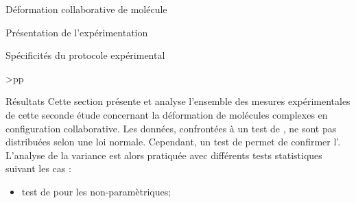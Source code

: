 \documentclass[myfrancais,ngerman,english,frenchb]{mythesis}
\begin{document}
\begin{mychapter}{Déformation collaborative de molécule}
\begin{mysection}{Présentation de l'expérimentation}
\begin{mysubsection}{Spécificités du protocole expérimental}
\begin{mytable}
\begin{mytabular}{>{\bfseries}p{\exptwofirstcolumn}p{\exptwosecondcolumn}}
						\mymiddlerule[\heavyrulewidth]
						 \\
						\mybottomrule
					\end{mytabular}
				\end{mytable}
			\end{mysubsection}
		\end{mysection}
		\begin{mysection}{Résultats}
			Cette section présente et analyse l'ensemble des mesures expérimentales de cette seconde étude concernant la déformation de molécules complexes en configuration collaborative.
			Les données, confrontées à un test de , ne sont pas distribuées selon une loi normale.
			Cependant, un test de  permet de confirmer l'.
			L'analyse de la variance est alors pratiquée avec différents tests statistiques suivant les cas :
			\begin{itemize}
				\item test de  pour les  non-paramètriques;

\end{itemize}
\end{mysection}
\end{mychapter}
\end{document}
